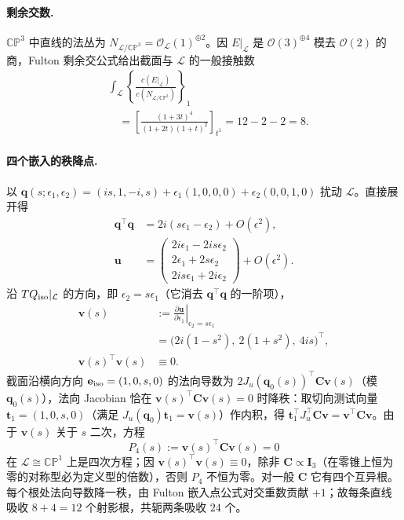 \paragraph{剩余交数.} $\mathbb{CP}^3$ 中直线的法丛为 $N_{\mathcal L/\mathbb{CP}^3}=\mathcal O_{\mathcal L}(1)^{\oplus2}$。因 $E|_{\mathcal L}$ 是 $\mathcal O(3)^{\oplus4}$ 模去 $\mathcal O(2)$ 的商，Fulton 剩余交公式给出截面与 $\mathcal L$ 的一般接触数
\begin{equation}
\begin{aligned}
&\int_{\mathcal L}\left\{\frac{c(E|_{\mathcal L})}{c(N_{\mathcal L/\mathbb{CP}^3})}\right\}_1\\
&\quad=\left[\frac{(1+3t)^4}{(1+2t)(1+t)^2}\right]_{t^1}=12-2-2=8 .
\end{aligned}
\end{equation}

\paragraph{四个嵌入的秩降点.} 以 $\mathbf q(s;\epsilon_1,\epsilon_2)=(is,1,-i,s)+\epsilon_1(1,0,0,0)+\epsilon_2(0,0,1,0)$ 扰动 $\mathcal L$。直接展开得
\begin{equation}
\begin{aligned}
\mathbf q^\top\mathbf q&=2i(s\epsilon_1-\epsilon_2)+O(\epsilon^2),\\
\mathbf u&=\begin{pmatrix}2i\epsilon_1-2is\epsilon_2\\ 2\epsilon_1+2s\epsilon_2\\ 2is\epsilon_1+2i\epsilon_2\end{pmatrix}+O(\epsilon^2).
\end{aligned}
\end{equation}
沿 $TQ_{\rm iso}|_{\mathcal L}$ 的方向，即 $\epsilon_2=s\epsilon_1$（它消去 $\mathbf q^\top\mathbf q$ 的一阶项），
\begin{equation}
\begin{aligned}
\mathbf v(s)&:=\left.\frac{\partial\mathbf u}{\partial\epsilon_1}\right|_{\epsilon_2=s\epsilon_1}\\
&=\big(2i(1-s^2),\ 2(1+s^2),\ 4is\big)^\top,\\
\mathbf v(s)^\top\mathbf v(s)&\equiv0 .
\end{aligned}
\end{equation}
截面沿横向方向 $\mathbf e_{\rm iso}=(1,0,s,0)$ 的法向导数为 $2J_u(\mathbf q_0(s))^\top\mathbf C\mathbf v(s)$（模 $\mathbf q_0(s)$），法向 Jacobian 恰在 $\mathbf v(s)^\top\mathbf C\mathbf v(s)=0$ 时降秩：取切向测试向量 $\mathbf t_1=(1,0,s,0)$（满足 $J_u(\mathbf q_0)\mathbf t_1=\mathbf v(s)$）作内积，得 $\mathbf t_1^\top J_u^\top\mathbf C\mathbf v=\mathbf v^\top\mathbf C\mathbf v$。由于 $\mathbf v(s)$ 关于 $s$ 二次，方程
\[
P_4(s):=\mathbf v(s)^\top\mathbf C\mathbf v(s)=0
\]
在 $\mathcal L\cong\mathbb{CP}^1$ 上是四次方程；因 $\mathbf v(s)^\top\mathbf v(s)\equiv0$，除非 $\mathbf C\propto\mathbf I_3$（在零锥上恒为零的对称型必为定义型的倍数），否则 $P_4$ 不恒为零。对一般 $\mathbf C$ 它有四个互异根。每个根处法向导数降一秩，由 Fulton 嵌入点公式对交重数贡献 $+1$；故每条直线吸收 $8+4=12$ 个射影根，共轭两条吸收 $24$ 个。

